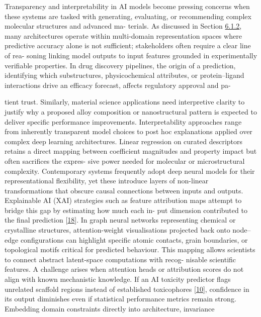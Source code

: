 \documentclass[
]{article}
\begin{document}
Transparency and interpretability in AI models become pressing concerns
when these systems are tasked with generating, evaluating, or
recommending complex molecular structures and advanced ma- terials. As
discussed in Section
\protect\hyperlink{transfer-learning-across-domains}{6.1.2}, many
architectures operate within multi-domain representation spaces where
predictive accuracy alone is not sufficient; stakeholders often require
a clear line of rea- soning linking model outputs to input features
grounded in experimentally verifiable properties. In drug discovery
pipelines, the origin of a prediction, identifying which substructures,
physicochemical attributes, or protein--ligand interactions drive an
efficacy forecast, affects regulatory approval and pa-

tient trust. Similarly, material science applications need interpretive
clarity to justify why a proposed alloy composition or nanostructural
pattern is expected to deliver specific performance improvements.
Interpretability approaches range from inherently transparent model
choices to post hoc explanations applied over complex deep learning
architectures. Linear regression on curated descriptors retains a direct
mapping between coefficient magnitudes and property impact but often
sacrifices the expres- sive power needed for molecular or
microstructural complexity. Contemporary systems frequently adopt deep
neural models for their representational flexibility, yet these
introduce layers of non-linear transformations that obscure causal
connections between inputs and outputs. Explainable AI (XAI) strategies
such as feature attribution maps attempt to bridge this gap by
estimating how much each in- put dimension contributed to the final
prediction {[}\protect\hyperlink{_bookmark58}{18}{]}. In graph neural
networks representing chemical or crystalline structures,
attention-weight visualisations projected back onto node--edge
configurations can highlight specific atomic contacts, grain boundaries,
or topological motifs critical for predicted behaviour. This mapping
allows scientists to connect abstract latent-space computations with
recog- nisable scientific features. A challenge arises when attention
heads or attribution scores do not align with known mechanistic
knowledge. If an AI toxicity predictor flags unrelated scaffold regions
instead of established toxicophores
{[}\protect\hyperlink{_bookmark50}{10}{]}, confidence in its output
diminishes even if statistical performance metrics remain strong.
Embedding domain constraints directly into architecture, invariance
\end{document}
